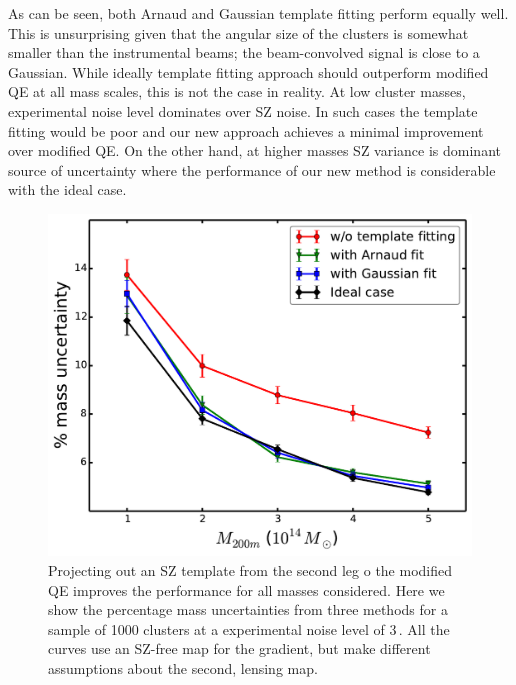 {As can be seen, both Arnaud and Gaussian template fitting perform equally well.
 This is unsurprising given that the angular size of the clusters is somewhat smaller than the instrumental beams; the beam-convolved signal is close to a Gaussian. 
While ideally template fitting approach should outperform modified QE at all mass scales, this is not the case in reality.
At low cluster masses, experimental noise level dominates over SZ noise.
 In such cases the template fitting would be poor and our new approach achieves a minimal improvement over modified QE. 
 On the other hand, at higher masses SZ variance is dominant source of uncertainty where the performance of our new method is considerable with the ideal case. %
 \begin{figure}[htb]
\includegraphics[width=\linewidth]{figs/uncen_vs_mass.pdf}
 \caption{
 Projecting out an SZ template from the second leg o the modified QE improves the performance for all masses considered. 
 Here we show the percentage mass uncertainties from three methods for a sample of 1000 clusters at a experimental noise level of 3\,\ukarcmin{}.
 All the curves use an SZ-free map for the gradient, but make different assumptions about the second, lensing map. 
}
\end{figure}}
